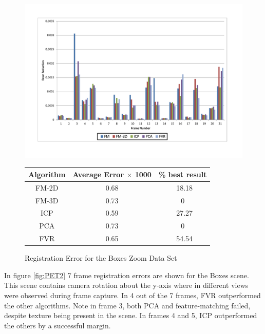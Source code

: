 \begin{figure}
\centering
\includegraphics[width=6in]{images/results/Boxes_Texture_ZoomOut}
\caption{Registration Error for the Boxes Zoom Data Set}
\label{fig:PET3}

\begin{tabular}{ccc}
\hline
\textbf{Algorithm} & \textbf{Average Error $\times$ 1000} & \textbf{\% best result}\\ \hline
FM-2D	& 0.68 & ~18.18\\
FM-3D	& 0.73 & 0\\
ICP		& 0.59 & ~27.27\\
PCA		& 0.73 & 0\\
FVR		& 0.65 & ~54.54\\
\end{tabular}
\label{tab:PET3ST}
\end{figure} 



In figure \ref{fig:PET2} 7 frame registration errors are shown for the Boxes scene. This scene contains camera rotation about the y-axis where in different views were observed during frame capture. In 4 out of the 7 frames, FVR outperformed the other algorithms. Note in frame 3, both PCA and feature-matching failed, despite texture being present in the scene. In frames 4 and 5, ICP outperformed the others by a successful margin.  \\

